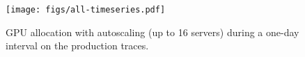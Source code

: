 \begin{figure}[!t]
  \centering
  \texttt{[image: figs/all-timeseries.pdf]}
  \caption{GPU allocation with autoscaling (up to 16 servers) during a one-day interval on the production traces.}
  \label{fig:eval:autoscaling}
\end{figure}